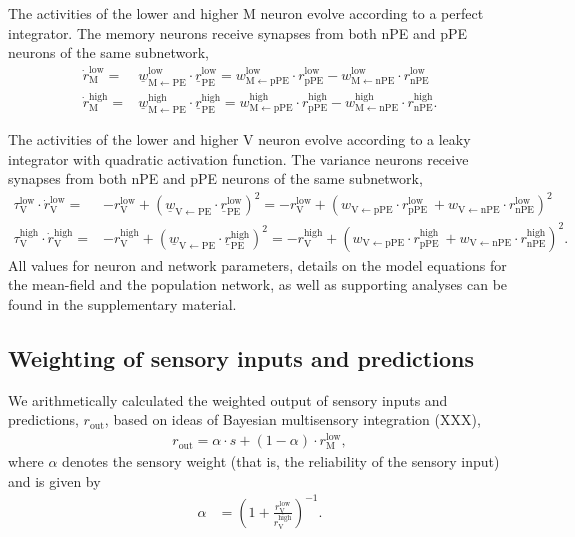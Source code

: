\documentclass[10pt,a4paper,draft]{article}
\begin{document}
The activities of the lower and higher M neuron evolve according to a perfect integrator. The memory neurons receive synapses from both nPE and pPE neurons of the same subnetwork,
%
\begin{align}
\dot{r}_\mathrm{M}^\mathrm{low} =& \underline{w}_\mathrm{M \leftarrow PE}^\mathrm{low} \cdot \underline{r}_\mathrm{PE}^\mathrm{low} = w_\mathrm{M \leftarrow pPE}^\mathrm{low} \cdot r_\mathrm{pPE}^\mathrm{low} - w_\mathrm{M \leftarrow nPE}^\mathrm{low} \cdot r_\mathrm{nPE}^\mathrm{low} \nonumber \\
%
\dot{r}_\mathrm{M}^\mathrm{high} =& \underline{w}_\mathrm{M \leftarrow PE} ^\mathrm{high} \cdot \underline{r}_\mathrm{PE}^\mathrm{high} = w_\mathrm{M \leftarrow pPE}^\mathrm{high}  \cdot r_\mathrm{pPE}^\mathrm{high} - w_\mathrm{M \leftarrow nPE}^\mathrm{high}  \cdot r_\mathrm{nPE}^\mathrm{high} .
\end{align}
%

The activities of the lower and higher V neuron evolve according to a leaky integrator with quadratic activation function. The variance neurons receive synapses from both nPE and pPE neurons of the same subnetwork,
%
\begin{align}
\tau_\mathrm{V}^\mathrm{low} \cdot \dot{r}_\mathrm{V}^\mathrm{low} =& - r_\mathrm{V}^\mathrm{low} + \left( \underline{w}_\mathrm{V \leftarrow PE} \cdot \underline{r}_\mathrm{PE}^\mathrm{low}\right)^2 = - r_\mathrm{V}^\mathrm{low} + \left( w_\mathrm{V \leftarrow pPE} \cdot r_\mathrm{pPE}^\mathrm{low}\ + w_\mathrm{V \leftarrow nPE} \cdot r_\mathrm{nPE}^\mathrm{low}\right)^2 \nonumber\\
%
\tau_\mathrm{V}^\mathrm{high} \cdot \dot{r}_\mathrm{V}^\mathrm{high} =& - r_\mathrm{V}^\mathrm{high} + \left( \underline{w}_\mathrm{V \leftarrow PE} \cdot \underline{r}_\mathrm{PE}^\mathrm{high}\right)^2 = - r_\mathrm{V}^\mathrm{high} + \left( w_\mathrm{V \leftarrow pPE} \cdot r_\mathrm{pPE}^\mathrm{high}\ + w_\mathrm{V \leftarrow nPE} \cdot r_\mathrm{nPE}^\mathrm{high}\right)^2.
\end{align} 
%
All values for neuron and network parameters, details on the model equations for the mean-field and the population network, as well as supporting analyses can be found in the supplementary material.

\subsection*{Weighting of sensory inputs and predictions}
%
We arithmetically calculated the weighted output of sensory inputs and predictions, $r_\mathrm{out}$, based on ideas of Bayesian multisensory integration (XXX),
%
\begin{align}
r_\mathrm{out} = \alpha \cdot s + (1-\alpha) \cdot r_\mathrm{M}^\mathrm{low},
\end{align}
%
where $\alpha$ denotes the sensory weight (that is, the reliability of the sensory input) and is given by 
%
\begin{align}
\alpha &= \left( 1 + \frac{r_\mathrm{V}^\mathrm{low}}{r_\mathrm{V}^\mathrm{high}} \right)^{-1}.
\end{align}
\end{document}

